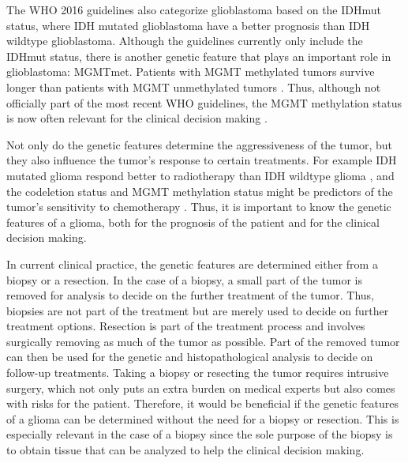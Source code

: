 The \gls{WHO} 2016 guidelines also categorize \gls{glioblastoma} based on the \gls{IDHmut} status, where \gls{IDH} mutated \gls{glioblastoma} have a better prognosis than \gls{IDH} wildtype \gls{glioblastoma}.
Although the guidelines currently only include the \gls{IDHmut} status, there is another genetic feature that plays an important role in \gls{glioblastoma}: \gls{MGMTmet}.
Patients with \gls{MGMT} methylated \glspl{tumor} survive longer than patients with \gls{MGMT} unmethylated \glspl{tumor} \autocite{martinez2007MGMT, gessler2018MGMT, weller2009molecularGBM}.
Thus, although not officially part of the most recent \gls{WHO} guidelines, the \gls{MGMT} methylation status is now often relevant for the clinical decision making \cite{molinaro2019geneticepidemiology}.

Not only do the genetic features determine the aggressiveness of the \gls{tumor}, but they also influence the \gls{tumor}'s response to certain treatments.
For example \gls{IDH} mutated \gls{glioma} respond better to radiotherapy than \gls{IDH} wildtype \gls{glioma} \autocite{juratli2015IDHtreatment}, and the \gls{codeletion} status and \gls{MGMT} methylation status might be predictors of the \gls{tumor}'s sensitivity to chemotherapy \autocite{idbaih2007markersresponse}.
Thus, it is important to know the genetic features of a \gls{glioma}, both for the prognosis of the patient and for the clinical decision making.

In current clinical practice, the genetic features are determined either from a biopsy or a resection.
In the case of a biopsy, a small part of the \gls{tumor} is removed for analysis to decide on the further treatment of the \gls{tumor}.
Thus, biopsies are not part of the treatment but are merely used to decide on further treatment options.
Resection is part of the treatment process and involves surgically removing as much of the \gls{tumor} as possible.
Part of the removed \gls{tumor} can then be used for the genetic and histopathological analysis to decide on follow-up treatments.
Taking a biopsy or resecting the \gls{tumor} requires intrusive surgery, which not only puts an extra burden on medical experts but also comes with risks for the patient.
Therefore, it would be beneficial if the genetic features of a \gls{glioma} can be determined without the need for a biopsy or resection.
This is especially relevant in the case of a biopsy since the sole purpose of the biopsy is to obtain tissue that can be analyzed to help the clinical decision making.

